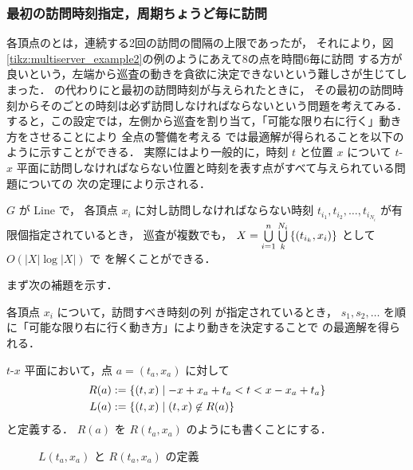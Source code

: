 \subsubsection{最初の訪問時刻指定，周期ちょうど毎に訪問}

各頂点の{\timelimit}とは，連続する2回の訪問の間隔の上限であったが，
それにより，図\ref{tikz:multiserver_example2}の例のようにあえて{\timelimit}8の点を時間6毎に訪問
する方が良いという，左端から巡査の動きを貪欲に決定できないという難しさが生じてしまった．
{\timelimit}の代わりに{\period}と最初の訪問時刻が与えられたときに，
その最初の訪問時刻からその{\period}ごとの時刻は必ず訪問しなければならないという問題を考えてみる．
すると，この設定では，左側から巡査を割り当て，「可能な限り右に行く」動き方をさせることにより
全点の警備を考える \decisionpp では最適解が得られることを以下のように示すことができる．
実際にはより一般的に，時刻 $t$ と位置 $x$ について
$t$-$x$ 平面に訪問しなければならない位置と時刻を表す点がすべて与えられている問題についての
次の定理により示される．


\begin{theo}
	\label{theo:2_Line_exact_finite}
	$G$ が Line で，
	各頂点 $x_i$ に対し訪問しなければならない時刻 $t_{i_1}, t_{i_2}, \ldots, t_{i_{N_i}}$ が有限個指定されているとき，
	巡査が複数でも，
	$X = \bigcup\limits_{i = 1}^n \bigcup\limits_k^{N_i} \left\{{(t_{i_k}, x_i)}\right\}$
	として $O( |X| \log |X| )$ で \decisionpp を解くことができる．
\end{theo}

まず次の補題を示す．

\begin{lemm}
	\label{lemm:xt_decided_1}
	各頂点 $x_i$ について，訪問すべき時刻の列
	が指定されているとき，
	$s_1, s_2, \ldots$ を順に「可能な限り右に行く動き方」により動きを決定することで
	\decisionpp の最適解を得られる．
\end{lemm}



\begin{defi}
	$t$-$x$ 平面において，点 $a = (t_a,x_a)$ に対して
	\begin{alignat*}{3}
	R(a)
	&:= \left\{{(t,x)}\;\middle|\;{ -x + x_a + t_a < t < x - x_a + t_a }\right\} \\
	L(a)
	&:= \left\{{(t,x)}\;\middle|\;{ (t,x) \not\in R(a) }\right\}
	\end{alignat*}
	と定義する．
	$R(a)$ を $R(t_a,x_a)$ のようにも書くことにする．
	\begin{figure}[h]
		\centering
		\caption{$L(t_a,x_a)$ と $R(t_a,x_a)$ の定義 \label{tikz:defLR}}
	\end{figure}
\end{defi}


